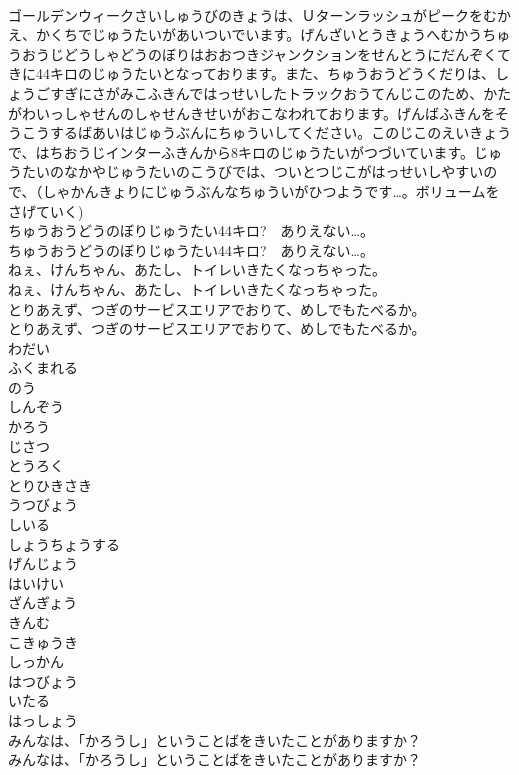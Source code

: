 \documentclass[8pt]{extreport}
\begin{document}
\begin{CJK}{UTF8}{min}
\\	ゴールデンウィークさいしゅうびのきょうは、Ｕターンラッシュがピークをむかえ、かくちでじゅうたいがあいついでいます。げんざいとうきょうへむかうちゅうおうじどうしゃどうのぼりはおおつきジャンクションをせんとうにだんぞくてきに44キロのじゅうたいとなっております。また、ちゅうおうどうくだりは、しょうごすぎにさがみこふきんではっせいしたトラックおうてんじこのため、かたがわいっしゃせんのしゃせんきせいがおこなわれております。げんばふきんをそうこうするばあいはじゅうぶんにちゅういしてください。このじこのえいきょうで、はちおうじインターふきんから8キロのじゅうたいがつづいています。じゅうたいのなかやじゅうたいのこうびでは、ついとつじこがはっせいしやすいので、（しゃかんきょりにじゅうぶんなちゅういがひつようです…。ボリュームをさげていく) 
\\	ちゅうおうどうのぼりじゅうたい44キロ?　ありえない…。	
\\	ちゅうおうどうのぼりじゅうたい44キロ?　ありえない…。 
\\	ねぇ、けんちゃん、あたし、トイレいきたくなっちゃった。	
\\	ねぇ、けんちゃん、あたし、トイレいきたくなっちゃった。 
\\	とりあえず、つぎのサービスエリアでおりて、めしでもたべるか。	
\\	とりあえず、つぎのサービスエリアでおりて、めしでもたべるか。 
\\	わだい
\\	ふくまれる
\\	のう
\\	しんぞう
\\	かろう
\\	じさつ
\\	とうろく
\\	とりひきさき
\\	うつびょう
\\	しいる
\\	しょうちょうする
\\	げんじょう
\\	はいけい
\\	ざんぎょう
\\	きんむ
\\	こきゅうき
\\	しっかん
\\	はつびょう
\\	いたる
\\	はっしょう
\\	みんなは、「かろうし」ということばをきいたことがありますか？	
\\	みんなは、「かろうし」ということばをきいたことがありますか？ 

\end{CJK}
\end{document}
